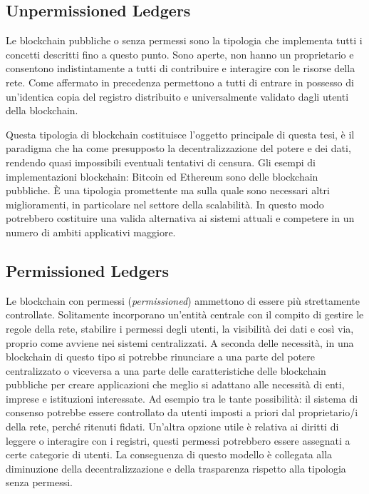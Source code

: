 \subsection{Unpermissioned Ledgers}

Le blockchain pubbliche o senza permessi sono la tipologia che implementa tutti i concetti descritti fino a questo punto. Sono aperte, non hanno un proprietario e consentono indistintamente a tutti di contribuire e interagire con le risorse della rete. Come affermato in precedenza permettono a tutti di entrare in possesso di un’identica copia del  registro distribuito e universalmente validato dagli utenti della blockchain.

Questa tipologia di blockchain costituisce l’oggetto principale di questa tesi, è il paradigma che ha come presupposto la decentralizzazione del potere e dei dati, rendendo quasi impossibili eventuali tentativi di censura. Gli esempi di implementazioni blockchain: Bitcoin ed Ethereum sono delle blockchain pubbliche. È una tipologia promettente ma sulla quale sono necessari altri miglioramenti, in particolare nel settore della scalabilità. In questo modo potrebbero costituire una valida alternativa ai sistemi attuali e competere in un numero di ambiti applicativi maggiore.

\subsection{Permissioned Ledgers}

Le blockchain con permessi (\emph{permissioned}) ammettono di essere più strettamente controllate. Solitamente incorporano un’entità centrale con il compito di gestire le regole della rete, stabilire i permessi degli utenti, la visibilità dei dati e così via, proprio come avviene nei sistemi centralizzati. A seconda delle necessità, in una blockchain di questo tipo si potrebbe rinunciare a una parte del potere centralizzato o viceversa a una parte delle caratteristiche delle blockchain pubbliche per creare applicazioni che meglio si adattano alle necessità di enti, imprese e istituzioni interessate. Ad esempio tra le tante possibilità: il sistema di consenso potrebbe essere controllato da utenti imposti a priori dal proprietario/i della rete, perché ritenuti fidati. Un'altra opzione utile è relativa ai diritti di leggere o interagire con i registri, questi permessi potrebbero essere assegnati a certe categorie di utenti. La conseguenza di questo modello è collegata alla diminuzione della decentralizzazione e della trasparenza rispetto alla tipologia senza permessi.

